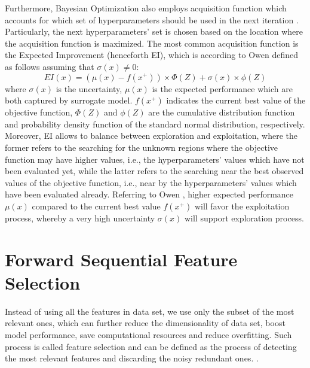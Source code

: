 Furthermore, Bayesian Optimization also employs acquisition function which accounts for which set of hyperparameters should be used in the next iteration \citep{owen2022hyperparameter}. Particularly, the next hyperparameters' set is chosen based on the location where the acquisition function is maximized.
The most common acquisition function is the Expected Improvement (henceforth EI), which is according to Owen \citep{owen2022hyperparameter} defined as follows assuming that $ \sigma\left(x\right) \neq 0$:
\begin{equation}\label{eq}
    EI(x) = \left(\mu\left(x\right) - f\left(x^{+}\right)\right) \times \Phi\left(Z\right) + \sigma\left(x\right) \times \phi\left(Z\right)
\end{equation}
where $\sigma\left(x\right)$ is the uncertainty, $\mu\left(x\right)$ is the expected performance which are both captured by surrogate model. $f\left(x^{+}\right)$ indicates the current best value of the objective function, $\Phi\left(Z\right)$ and $\phi\left(Z\right)$ are the cumulative distribution function and probability density function of the standard normal distribution, respectively.
Moreover, EI allows to balance between exploration and exploitation, where the former refers to the searching for the unknown regions where the objective function may have higher values, i.e., the hyperparameters' values which have not been evaluated yet, while the latter refers to the searching near the best observed values of the objective function, i.e., near by the hyperparameters' values which have been evaluated already.
Referring to Owen \citep{owen2022hyperparameter}, higher expected performance $\mu\left(x\right)$ compared to the current best value $f\left(x^{+}\right)$ will favor the exploitation process, whereby a very high uncertainty $\sigma\left(x\right)$ will support exploration process.

\newpage
\section{Forward Sequential Feature Selection}
\label{sec:fsfstheory}
Instead of using all the features in data set, we use only the subset of the most relevant ones, which can further reduce the dimensionality of data set, boost model performance, save computational resources and reduce overfitting. Such process is called feature selection and can be defined as the process of detecting the most relevant features and discarding the noisy redundant ones. \citep{bolon2015feature}.

